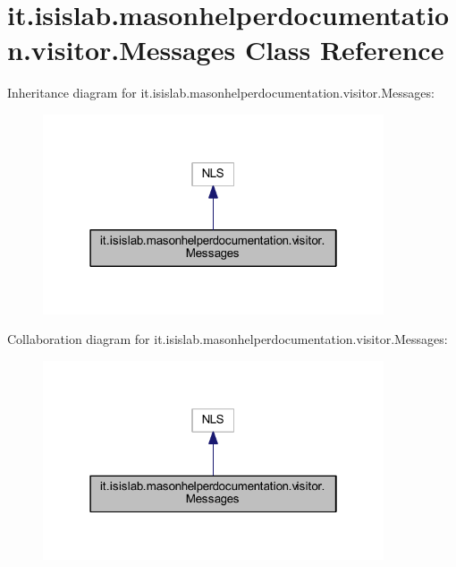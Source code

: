 \hypertarget{classit_1_1isislab_1_1masonhelperdocumentation_1_1visitor_1_1_messages}{\section{it.\-isislab.\-masonhelperdocumentation.\-visitor.\-Messages Class Reference}
\label{classit_1_1isislab_1_1masonhelperdocumentation_1_1visitor_1_1_messages}
}


Inheritance diagram for it.\-isislab.\-masonhelperdocumentation.\-visitor.\-Messages\-:
\nopagebreak
\begin{figure}[H]
\begin{center}
\leavevmode
\includegraphics[width=286pt]{classit_1_1isislab_1_1masonhelperdocumentation_1_1visitor_1_1_messages__inherit__graph}
\end{center}
\end{figure}


Collaboration diagram for it.\-isislab.\-masonhelperdocumentation.\-visitor.\-Messages\-:
\nopagebreak
\begin{figure}[H]
\begin{center}
\leavevmode
\includegraphics[width=286pt]{classit_1_1isislab_1_1masonhelperdocumentation_1_1visitor_1_1_messages__coll__graph}
\end{center}
\end{figure}
